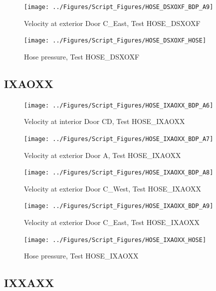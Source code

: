 \documentclass[12pt,oneside]{book}
\begin{document}
\begin{figure}[!ht]
\texttt{[image: ../Figures/Script\_Figures/HOSE\_DSXOXF\_BDP\_A9]}
\caption{Velocity at exterior Door C\_East, Test HOSE\_DSXOXF}
\label{fig:HOSE_DSXOXF_BDP_A9}
\end{figure}

\begin{figure}[!ht]
\texttt{[image: ../Figures/Script\_Figures/HOSE\_DSXOXF\_HOSE]}
\caption{Hose pressure, Test HOSE\_DSXOXF}
\label{fig:HOSE_DSXOXF_HOSE}
\end{figure}


\clearpage


\subsection{IXAOXX}

\begin{figure}[!ht]
\texttt{[image: ../Figures/Script\_Figures/HOSE\_IXAOXX\_BDP\_A6]}
\caption{Velocity at interior Door CD, Test HOSE\_IXAOXX}
\label{fig:HOSE_IXAOXX_BDP_A6}
\end{figure}

\begin{figure}[!ht]
\texttt{[image: ../Figures/Script\_Figures/HOSE\_IXAOXX\_BDP\_A7]}
\caption{Velocity at exterior Door A, Test HOSE\_IXAOXX}
\label{fig:HOSE_IXAOXX_BDP_A7}
\end{figure}

\begin{figure}[!ht]
\texttt{[image: ../Figures/Script\_Figures/HOSE\_IXAOXX\_BDP\_A8]}
\caption{Velocity at exterior Door C\_West, Test HOSE\_IXAOXX}
\label{fig:HOSE_IXAOXX_BDP_A8}
\end{figure}

\begin{figure}[!ht]
\texttt{[image: ../Figures/Script\_Figures/HOSE\_IXAOXX\_BDP\_A9]}
\caption{Velocity at exterior Door C\_East, Test HOSE\_IXAOXX}
\label{fig:HOSE_IXAOXX_BDP_A9}
\end{figure}

\begin{figure}[!ht]
\texttt{[image: ../Figures/Script\_Figures/HOSE\_IXAOXX\_HOSE]}
\caption{Hose pressure, Test HOSE\_IXAOXX}
\label{fig:HOSE_IXAOXX_HOSE}
\end{figure}


\clearpage


\subsection{IXXAXX}
\end{document}
